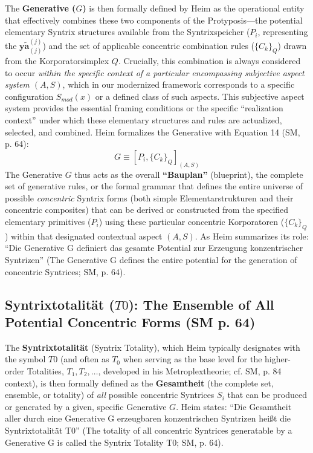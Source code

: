 \documentclass[
    12pt,              %
    a4paper,           %
    headings=normal,   %
    twoside=true,      %
    BCOR=8mm,          %
]{scrbook}
\newcommand{\q}[1]{\enquote{#1}}
\newcommand{\subjektiveraspekt}{S}
\newcommand{\elementarstruktur}{\bm{y\widetilde{a}}_{(j)}}
\newcommand{\syntrixtotalitaet}{T0}
\newcommand{\generative}{G}
\begin{document}
The \textbf{Generative (\(\generative\))} is then formally defined by Heim as the operational entity that effectively combines these two components of the Protyposis—the potential elementary Syntrix structures available from the Syntrixspeicher (\(P_i\), representing the \(\elementarstruktur^{(j)}\)) and the set of applicable concentric combination rules (\(\{C_k\}_Q\)) drawn from the Korporatorsimplex \(Q\). Crucially, this combination is always considered to occur \textit{within the specific context of a particular encompassing subjective aspect system \((A,\subjektiveraspekt)\)}, which in our modernized framework corresponds to a specific configuration \(S_{mod}(x)\) or a defined class of such aspects. This subjective aspect system provides the essential framing conditions or the specific \q{realization context} under which these elementary structures and rules are actualized, selected, and combined.
Heim formalizes the Generative with Equation 14 (SM, p. 64):
\begin{equation} \label{eq:original_generative_revised_2} %
\generative \equiv \left[ P_i, \{C_k\}_Q \right]_{(A,\subjektiveraspekt)}
\end{equation}
The Generative \(\generative\) thus acts as the overall \textbf{\q{Bauplan}} (blueprint), the complete set of generative rules, or the formal grammar that defines the entire universe of possible \textit{concentric} Syntrix forms (both simple Elementarstrukturen and their concentric composites) that can be derived or constructed from the specified elementary primitives (\(P_i\)) using these particular concentric Korporatoren (\(\{C_k\}_Q\)) within that designated contextual aspect \((A,\subjektiveraspekt)\). As Heim summarizes its role: \q{Die Generative G definiert das gesamte Potential zur Erzeugung konzentrischer Syntrizen} (The Generative G defines the entire potential for the generation of concentric Syntrices; SM, p. 64).

\subsection{Syntrixtotalität (\(\syntrixtotalitaet\)): The Ensemble of All Potential Concentric Forms (SM p. 64)}
\label{sec:ch4_syntrixtotalitaet_t0_revised} 

The \textbf{Syntrixtotalität} (Syntrix Totality), which Heim typically designates with the symbol \(\syntrixtotalitaet\) (and often as \(T_0\) when serving as the base level for the higher-order Totalities, \(T_1, T_2, \ldots\), developed in his Metroplextheorie; cf. SM, p. 84 context), is then formally defined as the \textbf{Gesamtheit} (the complete set, ensemble, or totality) of \textit{all} possible concentric Syntrices \(S_i\) that can be produced or generated by a given, specific Generative \(\generative\). Heim states: \q{Die Gesamtheit aller durch eine Generative G erzeugbaren konzentrischen Syntrizen heißt die Syntrixtotalität T0} (The totality of all concentric Syntrices generatable by a Generative G is called the Syntrix Totality T0; SM, p. 64).
\end{document}
